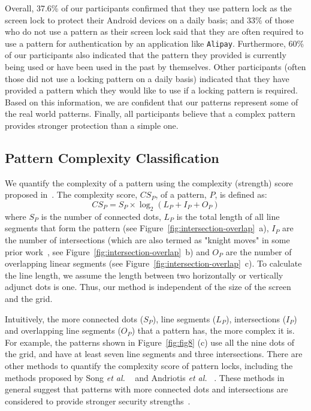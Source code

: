      Overall, 37.6\% of our participants confirmed that they use pattern lock as the screen lock to
     protect their Android devices on a daily basis; and 33\% of those  who do not use a pattern as their screen lock said that they
     are often required to use a pattern for authentication by an application like \texttt{Alipay}. Furthermore, 60\%
     of our participants also indicated that the pattern they provided is currently being used
     or have been used in the past by themselves. Other participants (often those did not use a locking pattern on a daily basis) indicated that they
     have provided a pattern which they would like to use if a locking
     pattern is required. Based on this information, we are confident
     that our patterns represent some of the real world
     patterns. Finally, all participants believe that a complex pattern provides stronger protection than a simple one.

    \subsection{Pattern Complexity Classification}
    \label{section: pattern-complexity-classification}
    We quantify the complexity of a pattern using the complexity (strength) score proposed in~\cite{sun2014dissecting}.
        The complexity score, $CS_{P}$, of a pattern, $P$, is defined as:
    \begin{equation}
      CS_{P}=S_{P}\times\log_{2}(L_{P}+I_{P}+O_{P})
    \label{equ:compscore}
    \end{equation}
    where $S_{P}$ is the number of connected dots, $L_{P}$ is the
    total length of all line segments that form the pattern (see
    Figure~\ref{fig:intersection-overlap}~a), $I_{P}$ are the number of
    intersections (which are also termed as "knight moves" in some prior
    work~\cite{vonZezschwitz:2015:EDB:2702123.2702202}, see
    Figure~\ref{fig:intersection-overlap}~b) and $O_{P}$ are the number of
    overlapping linear segments (see
    Figure~\ref{fig:intersection-overlap}~c).  To calculate the line length,
    we assume the length between two horizontally or vertically adjunct dots
    is one. Thus, our method is independent of the size of the screen and the
    grid.


    Intuitively, the more connected dots ($S_{P}$), line segments ($L_{P}$),
    intersections ($I_{P}$) and overlapping line segments ($O_{P}$) that a
    pattern has, the more complex it is. For example, the patterns shown in
    Figure~\ref{fig:fig8} (c) use all the nine dots of the grid, and have  at
    least seven line segments and three intersections.
    There are other methods to quantify the complexity score of pattern locks, including the methods proposed by Song \emph{et al.} ~\cite{Song2015On} and Andriotis \emph{et al.}
    ~\cite{Andriotis2014Complexity}. These methods in general suggest that patterns with more connected dots and intersections are considered to provide stronger security strengths~\cite{Heidt2016Refining}.

